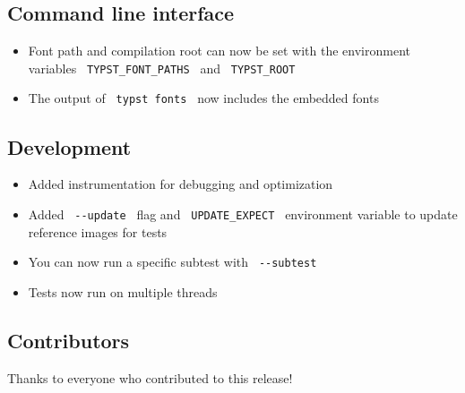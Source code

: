 \subsection{Command line interface}\label{command-line-interface}

\begin{itemize}
\tightlist
\item
  Font path and compilation root can now be set with the environment
  variables \texttt{\ TYPST\_FONT\_PATHS\ } and \texttt{\ TYPST\_ROOT\ }
\item
  The output of \texttt{\ typst\ fonts\ } now includes the embedded
  fonts
\end{itemize}

\subsection{Development}\label{development}

\begin{itemize}
\tightlist
\item
  Added instrumentation for debugging and optimization
\item
  Added \texttt{\ -\/-update\ } flag and \texttt{\ UPDATE\_EXPECT\ }
  environment variable to update reference images for tests
\item
  You can now run a specific subtest with \texttt{\ -\/-subtest\ }
\item
  Tests now run on multiple threads
\end{itemize}

\subsection{Contributors}\label{contributors}

Thanks to everyone who contributed to this release!

